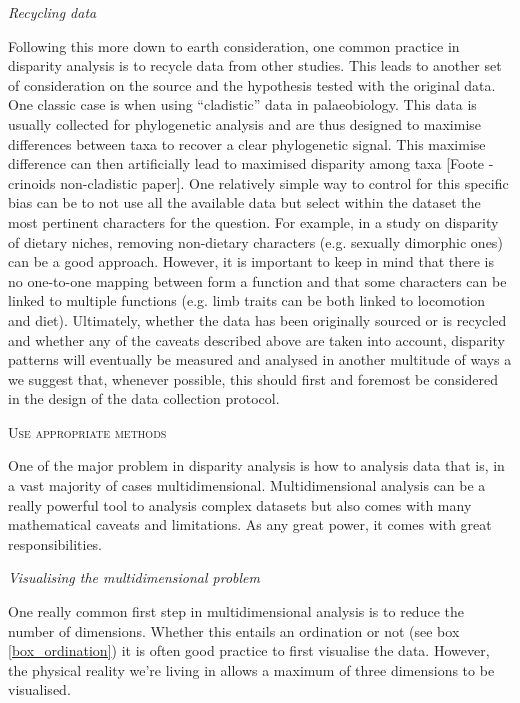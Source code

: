 \documentclass[12pt,letterpaper]{article}
\renewcommand{\section}[1]{%
\bigskip
\begin{center}
\begin{Large}
\normalfont\scshape #1
\medskip
\end{Large}
\end{center}}
\renewcommand{\subsection}[1]{%
\bigskip
\begin{center}
\begin{large}
\normalfont\itshape #1
\end{large}
\end{center}}
\begin{document}
\subsection{Recycling data}
Following this more down to earth consideration, one common practice in disparity analysis is to recycle data from other studies.
This leads to another set of consideration on the source and the hypothesis tested with the original data.
One classic case is when using ``cladistic'' data in palaeobiology.
This data is usually collected for phylogenetic analysis and are thus designed to maximise differences between taxa to recover a clear phylogenetic signal.
This maximise difference can then artificially lead to maximised disparity among taxa [Foote - crinoids non-cladistic paper].
One relatively simple way to control for this specific bias can be to not use all the available data but select within the dataset the most pertinent characters for the question.
For example, in a study on disparity of dietary niches, removing non-dietary characters (e.g. sexually dimorphic ones) can be a good approach.
However, it is important to keep in mind that there is no one-to-one mapping between form a function and that some characters can be linked to multiple functions (e.g. limb traits can be both linked to locomotion and diet).
Ultimately, whether the data has been originally sourced or is recycled and whether any of the caveats described above are taken into account, disparity patterns will eventually be measured and analysed in another multitude of ways a we suggest that, whenever possible, this should first and foremost be considered in the design of the data collection protocol.

\section{Use appropriate methods} 
One of the major problem in disparity analysis is how to analysis data that is, in a vast majority of cases multidimensional.
Multidimensional analysis can be a really powerful tool to analysis complex datasets but also comes with many mathematical caveats and limitations.
As any great power, it comes with great responsibilities.


\subsection{Visualising the multidimensional problem}
\label{visualisation}
One really common first step in multidimensional analysis is to reduce the number of dimensions.
Whether this entails an ordination or not (see box \ref{box_ordination}) it is often good practice to first visualise the data.
However, the physical reality we're living in allows a maximum of three dimensions to be visualised.
\end{document}
